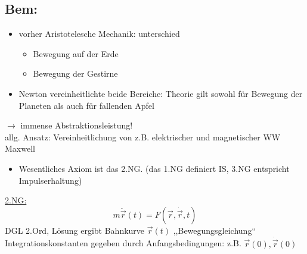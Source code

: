 \documentclass[titlepage,12pt,a4paper,ngerman]{report}
\begin{document}
{\subsection{Bem:} 
\begin{itemize}
	\item vorher Aristotelesche Mechanik: unterschied
	\begin{itemize}
		\item Bewegung auf der Erde
		\item Bewegung der Gestirne
	\end{itemize}
	\item Newton vereinheitlichte beide Bereiche: Theorie gilt sowohl für Bewegung der Planeten als auch für fallenden Apfel
\end{itemize}
$\rightarrow$ immense Abstraktionsleistung!\\
allg. Ansatz: Vereinheitlichung von z.B. elektrischer und magnetischer WW Maxwell
\begin{itemize}
	\item Wesentliches Axiom ist das 2.NG. (das 1.NG definiert IS, 3.NG entspricht Impulserhaltung)
\end{itemize}
\underline{2.NG:} 
$$m\ddot{\vec{r}}(t) = F(\vec{r},\dot{\vec{r}}, t)$$
DGL 2.Ord, Lösung ergibt Bahnkurve $\vec{r}(t)$ ,,Bewegungsgleichung``\\
Integrationskonstanten gegeben durch Anfangsbedingungen: z.B. $\vec{r}(0) , \dot{\vec{r}}(0)$\par
}
\end{document}
